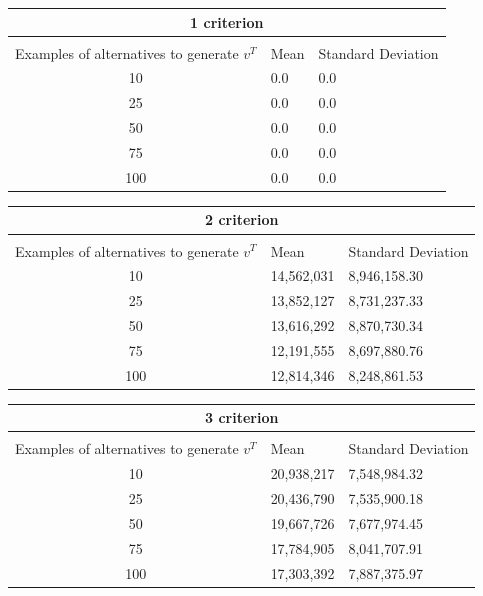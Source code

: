 \documentclass{report}
\begin{document}
\begin{center}
\begin{tabular}{ |c||p{3cm}|p{3cm}| }
 \hline
 \multicolumn{3}{|c|}{1 criterion} \\
 \hline
\\[-1em] Examples of alternatives to generate $v^T$& Mean & Standard Deviation\\
 \hline
 10   & 0.0    &0.0\\
 25   & 0.0    &0.0\\
 50   & 0.0    &0.0\\
 75  & 0.0    &0.0\\
 100   & 0.0    &0.0\\
 \hline
\end{tabular}
\end{center}

\begin{center}
\begin{tabular}{ |c||p{3cm}|p{3cm}| }
 \hline
 \multicolumn{3}{|c|}{2 criterion} \\
 \hline
\\[-1em] Examples of alternatives to generate $v^T$& Mean & Standard Deviation\\
 \hline
 10   & 14,562,031   & 8,946,158.30\\
 25   & 13,852,127   & 8,731,237.33\\
 50   & 13,616,292   & 8,870,730.34\\
 75   & 12,191,555   &  8,697,880.76\\
 100 & 12,814,346   & 8,248,861.53\\
 \hline
\end{tabular}
\end{center}

\begin{center}
\begin{tabular}{ |c||p{3cm}|p{3cm}| }
 \hline
 \multicolumn{3}{|c|}{3 criterion} \\
 \hline
\\[-1em] Examples of alternatives to generate $v^T$& Mean & Standard Deviation\\
 \hline
 10   & 20,938,217    &7,548,984.32\\
 25   & 20,436,790    &7,535,900.18\\
 50   & 19,667,726    &7,677,974.45\\
 75   & 17,784,905    &8,041,707.91\\
 100 & 17,303,392   &7,887,375.97\\
 \hline
\end{tabular}
\end{center}
\end{document}
